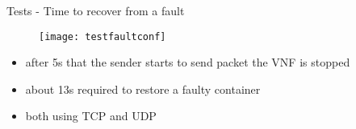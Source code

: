 \begin{frame}{Tests - Time to recover from a fault}

  \vspace{-1cm}

  \begin{figure}[H]
    \centering
    \texttt{[image: testfaultconf]}
  \end{figure}

  \begin{itemize}
  \item after 5s that the sender starts to send packet the VNF is stopped
  \item about 13s required to restore a faulty container
  \item both using TCP and UDP
  \end{itemize}

\end{frame}